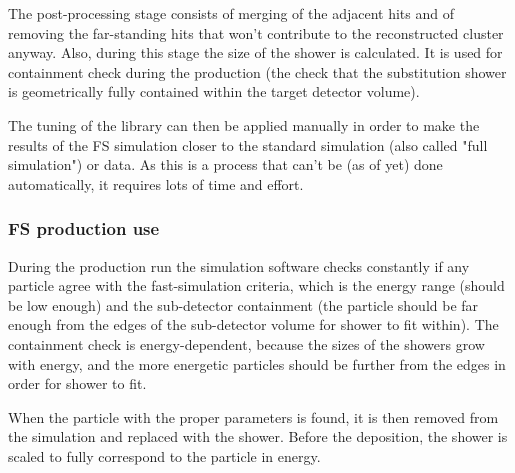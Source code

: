 The post-processing stage consists of merging of the adjacent hits and of removing the far-standing hits that won't contribute to the reconstructed cluster anyway. Also, during this stage the size of the shower is calculated. It is used for containment check during the production (the check that the substitution shower is geometrically fully contained within the target detector volume).

The tuning of the library can then be applied manually in order to make the results of the FS simulation closer to the standard simulation (also called "full simulation") or data. As this is a process that can't be (as of yet) done automatically, it requires lots of time and effort.

\subsubsection{FS production use}
\label{sec:MC_FS_prod}

During the production run the simulation software checks constantly if any particle agree with the fast-simulation criteria, which is the energy range (should be low enough) and the sub-detector containment (the particle should be far enough from the edges of the sub-detector volume for shower to fit within). The containment check is energy-dependent, because the sizes of the showers grow with energy, and the more energetic particles should be further from the edges in order for shower to fit.

When the particle with the proper parameters is found, it is then removed from the simulation and replaced with the shower. Before the deposition, the shower is scaled to fully correspond to the particle in energy.

\begin{figure}
\end{figure}

